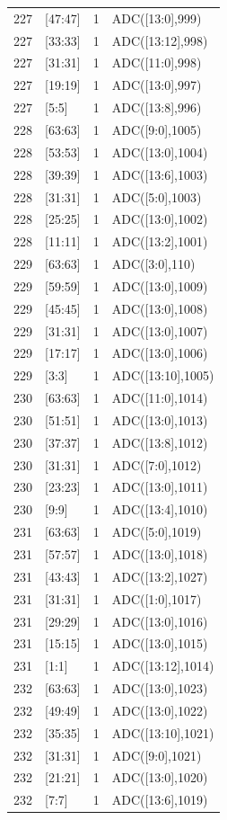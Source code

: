 \begin{longtable}{rlrl}
  227 & [47:47] &      1 &   ADC([13:0],999) \\
  227 & [33:33] &      1 &  ADC([13:12],998) \\
  227 & [31:31] &      1 &   ADC([11:0],998) \\
  227 & [19:19] &      1 &   ADC([13:0],997) \\
  227 &   [5:5] &      1 &   ADC([13:8],996) \\
  228 & [63:63] &      1 &   ADC([9:0],1005) \\
  228 & [53:53] &      1 &  ADC([13:0],1004) \\
  228 & [39:39] &      1 &  ADC([13:6],1003) \\
  228 & [31:31] &      1 &   ADC([5:0],1003) \\
  228 & [25:25] &      1 &  ADC([13:0],1002) \\
  228 & [11:11] &      1 &  ADC([13:2],1001) \\
  229 & [63:63] &      1 &    ADC([3:0],110) \\
  229 & [59:59] &      1 &  ADC([13:0],1009) \\
  229 & [45:45] &      1 &  ADC([13:0],1008) \\
  229 & [31:31] &      1 &  ADC([13:0],1007) \\
  229 & [17:17] &      1 &  ADC([13:0],1006) \\
  229 &   [3:3] &      1 & ADC([13:10],1005) \\
  230 & [63:63] &      1 &  ADC([11:0],1014) \\
  230 & [51:51] &      1 &  ADC([13:0],1013) \\
  230 & [37:37] &      1 &  ADC([13:8],1012) \\
  230 & [31:31] &      1 &   ADC([7:0],1012) \\
  230 & [23:23] &      1 &  ADC([13:0],1011) \\
  230 &   [9:9] &      1 &  ADC([13:4],1010) \\
  231 & [63:63] &      1 &   ADC([5:0],1019) \\
  231 & [57:57] &      1 &  ADC([13:0],1018) \\
  231 & [43:43] &      1 &  ADC([13:2],1027) \\
  231 & [31:31] &      1 &   ADC([1:0],1017) \\
  231 & [29:29] &      1 &  ADC([13:0],1016) \\
  231 & [15:15] &      1 &  ADC([13:0],1015) \\
  231 &   [1:1] &      1 & ADC([13:12],1014) \\
  232 & [63:63] &      1 &  ADC([13:0],1023) \\
  232 & [49:49] &      1 &  ADC([13:0],1022) \\
  232 & [35:35] &      1 & ADC([13:10],1021) \\
  232 & [31:31] &      1 &   ADC([9:0],1021) \\
  232 & [21:21] &      1 &  ADC([13:0],1020) \\
  232 &   [7:7] &      1 &  ADC([13:6],1019) \\
\end{longtable}
